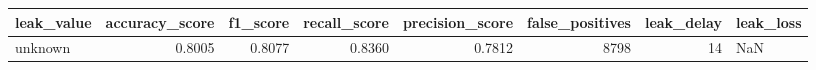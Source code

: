 \begin{tabular}{lrrrrrrl}
\toprule
leak\_value & accuracy\_score & f1\_score & recall\_score & precision\_score & false\_positives & leak\_delay & leak\_loss \\
\midrule
unknown & 0.8005 & 0.8077 & 0.8360 & 0.7812 & 8798 & 14 & NaN \\
\bottomrule
\end{tabular}
